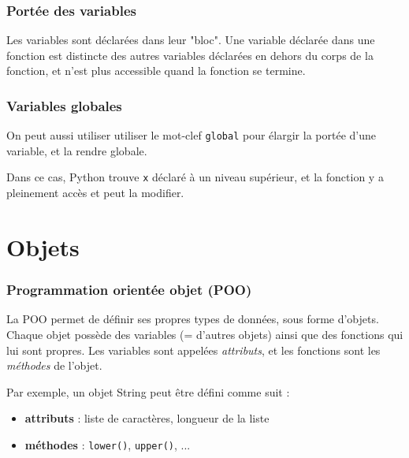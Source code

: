 \documentclass[handout]{beamer}
\begin{document}

\begin{frame}
\frametitle{Portée des variables}
Les variables sont déclarées dans leur "bloc". Une variable déclarée dans une fonction est distincte des autres variables déclarées en dehors du corps de la fonction, et n'est plus accessible quand la fonction se termine.
\porteeexemple
\end{frame}


\begin{frame}
\frametitle{Variables globales}
On peut aussi utiliser utiliser le mot-clef \texttt{global} pour élargir la portée d'une variable, et la rendre globale.

\variablesglobales

Dans ce cas, Python trouve \texttt{x} déclaré à un niveau supérieur, et la fonction y a pleinement accès et peut la modifier.
\end{frame}

\section{Objets}

\begin{frame}
\frametitle{Programmation orientée objet (POO)}
    La POO permet de définir ses propres types de données, sous forme d'objets.
    Chaque objet possède des variables (= d'autres objets) ainsi que des fonctions qui lui sont propres.
    Les variables sont appelées \textit{attributs}, et les fonctions sont les \textit{méthodes} de l'objet.
    
    \vspace{1cm}
    
    Par exemple, un objet String peut être défini comme suit :
    \begin{itemize}
        \item \textbf{attributs} : liste de caractères, longueur de la liste
        \item \textbf{méthodes} : \texttt{lower()}, \texttt{upper()}, ...
    \end{itemize}
\end{frame}
\end{document}
